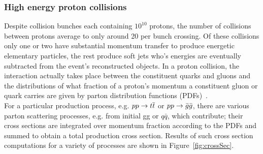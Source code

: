 \FloatBarrier
\subsubsection{High energy proton collisions}

Despite collision bunches each containing $10^{10}$ protons, the number of collisions
between protons average to only around 20 per bunch crossing. Of these collisions only
one or two have substantial momentum transfer to produce energetic elementary 
particles, the rest produce soft jets who's energies are eventually subtracted from the event's
reconstructed objects. In a proton collision, the interaction actually takes place between the 
constituent quarks and gluons and the distributions of what fraction of a proton's momentum a 
constituent gluon or quark carries are given by parton distribution functions (PDFs)~\cite{green2005high}. \\
\indent For a particular production process, e.g. $pp \rightarrow \relax{t}\overline{\relax{t}}$ or $pp \rightarrow \bar{g}\bar{g}$, there are 
various parton scattering processes, e.g. from initial gg or $q\bar{q}$, which contribute; their cross sections 
are integrated over momentum fraction according to the PDFs and summed to obtain a total production cross section.
Results of such cross section computations for a variety of processes are shown
in Figure~\ref{fig:crossSec}.

